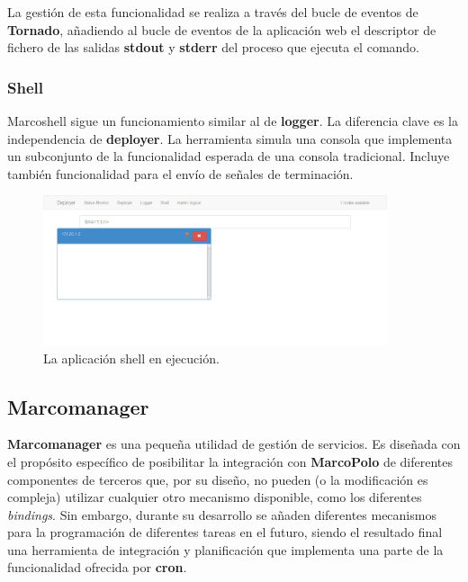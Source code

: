 La gestión de esta funcionalidad se realiza a través del bucle de eventos de \textbf{Tornado}, añadiendo al bucle de eventos de la aplicación web el descriptor de fichero de las salidas \textbf{stdout} y \textbf{stderr} del proceso que ejecuta el comando.

\subsubsection{Shell}

Marcoshell sigue un funcionamiento similar al de \textbf{logger}. La diferencia clave es la independencia de \textbf{deployer}. La herramienta simula una consola que implementa un subconjunto de la funcionalidad esperada de una consola tradicional. Incluye también funcionalidad para el envío de señales de terminación.

\begin{figure}[H]
\centering
\includegraphics[width=0.9\textwidth]{Chapters/Chapter5/Figures/logger-shell}
\caption[La aplicación shell en ejecución]{La aplicación shell en ejecución.}
\end{figure}

\subsection{Marcomanager}
\label{marcomanager}

\textbf{Marcomanager} es una pequeña utilidad de gestión de servicios. Es diseñada con el propósito específico de posibilitar la integración con \textbf{MarcoPolo} de diferentes componentes de terceros que, por su diseño, no pueden (o la modificación es compleja) utilizar cualquier otro mecanismo disponible, como los diferentes \textit{bindings}. Sin embargo, durante su desarrollo se añaden diferentes mecanismos para la programación de diferentes tareas en el futuro, siendo el resultado final una herramienta de integración y planificación que implementa una parte de la funcionalidad ofrecida por \textbf{cron}.

